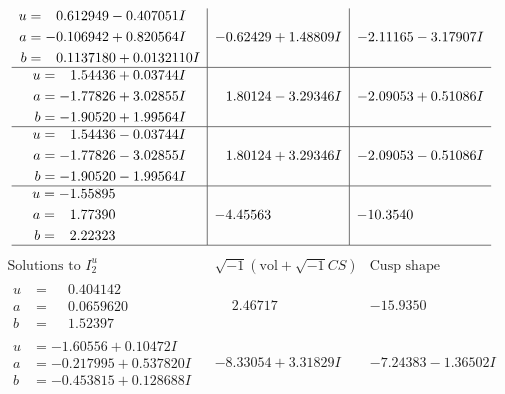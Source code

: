 \documentclass[1p]{elsarticle_modified}
\theoremstyle{definition}
\newcommand{\I}{\sqrt{-1}}
\begin{document}
$$\begin{array}{c|c|c}
\begin{aligned}
u &= \phantom{-}0.612949 - 0.407051 I \\
a &= -0.106942 + 0.820564 I \\
b &= \phantom{-}0.1137180 + 0.0132110 I\end{aligned}
 & -0.62429 + 1.48809 I & -2.11165 - 3.17907 I \\ \hline\begin{aligned}
u &= \phantom{-}1.54436 + 0.03744 I \\
a &= -1.77826 + 3.02855 I \\
b &= -1.90520 + 1.99564 I\end{aligned}
 & \phantom{-}1.80124 - 3.29346 I & -2.09053 + 0.51086 I \\ \hline\begin{aligned}
u &= \phantom{-}1.54436 - 0.03744 I \\
a &= -1.77826 - 3.02855 I \\
b &= -1.90520 - 1.99564 I\end{aligned}
 & \phantom{-}1.80124 + 3.29346 I & -2.09053 - 0.51086 I \\ \hline\begin{aligned}
u &= -1.55895\phantom{ +0.000000I} \\
a &= \phantom{-}1.77390\phantom{ +0.000000I} \\
b &= \phantom{-}2.22323\phantom{ +0.000000I}\end{aligned}
 & -4.45563\phantom{ +0.000000I} & -10.3540\phantom{ +0.000000I}\\
 \hline 
 \end{array}$$\newpage$$\begin{array}{c|c|c}  
\text{Solutions to }I^u_{2}& \I (\text{vol} + \sqrt{-1}CS) & \text{Cusp shape}\\
 \hline 
\begin{aligned}
u &= \phantom{-}0.404142\phantom{ +0.000000I} \\
a &= \phantom{-}0.0659620\phantom{ +0.000000I} \\
b &= \phantom{-}1.52397\phantom{ +0.000000I}\end{aligned}
 & \phantom{-}2.46717\phantom{ +0.000000I} & -15.9350\phantom{ +0.000000I} \\ \hline\begin{aligned}
u &= -1.60556 + 0.10472 I \\
a &= -0.217995 + 0.537820 I \\
b &= -0.453815 + 0.128688 I\end{aligned}
 & -8.33054 + 3.31829 I & -7.24383 - 1.36502 I \\ \hline\begin{aligned}

\end{aligned}
\end{array}$$
\end{document}
